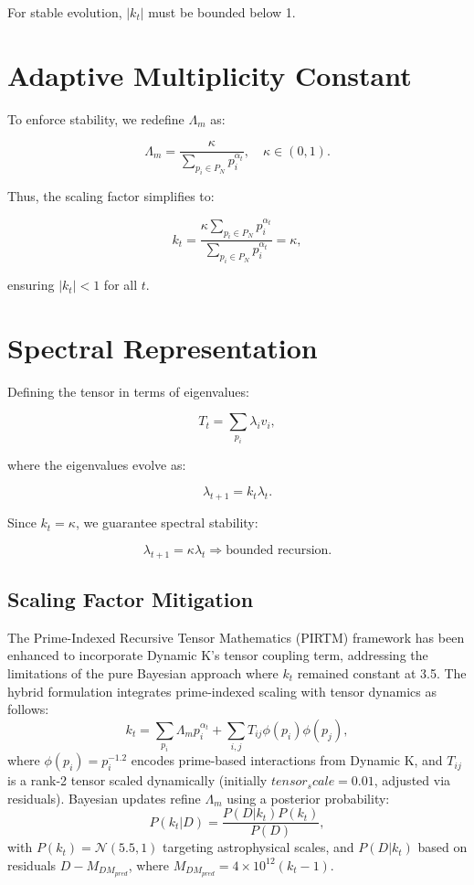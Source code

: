 \documentclass{article}
\theoremstyle{plain}
\begin{document}
For stable evolution, $|k_t|$ must be bounded below 1.

\section{Adaptive Multiplicity Constant}
To enforce stability, we redefine $\Lambda_m$ as:

\begin{equation}
    \Lambda_m = \frac{\kappa}{\sum_{p_i \in P_N} p_i^{\alpha_t}}, \quad \kappa \in (0,1).
\end{equation}

Thus, the scaling factor simplifies to:

\begin{equation}
    k_t = \frac{\kappa \sum_{p_i \in P_N} p_i^{\alpha_t}}{\sum_{p_i \in P_N} p_i^{\alpha_t}} = \kappa,
\end{equation}

ensuring $|k_t| < 1$ for all $t$.

\section{Spectral Representation}
Defining the tensor in terms of eigenvalues:

\begin{equation}
    T_t = \sum_{p_i} \lambda_i v_i,
\end{equation}

where the eigenvalues evolve as:

\begin{equation}
    \lambda_{t+1} = k_t \lambda_t.
\end{equation}

Since $k_t = \kappa$, we guarantee spectral stability:

\begin{equation}
    \lambda_{t+1} = \kappa \lambda_t \Rightarrow \text{bounded recursion}.
\end{equation}

\subsection{Scaling Factor Mitigation}
The Prime-Indexed Recursive Tensor Mathematics (PIRTM) framework has been enhanced to incorporate Dynamic K’s tensor coupling term, addressing the limitations of the pure Bayesian approach where \( k_t \) remained constant at 3.5. The hybrid formulation integrates prime-indexed scaling with tensor dynamics as follows:
\[
k_t = \sum_{p_i} \Lambda_m p_i^{\alpha_t} + \sum_{i,j} T_{ij} \phi(p_i) \phi(p_j),
\]
where \( \phi(p_i) = p_i^{-1.2} \) encodes prime-based interactions from Dynamic K, and \( T_{ij} \) is a rank-2 tensor scaled dynamically (initially \( tensor_scale = 0.01 \), adjusted via residuals). Bayesian updates refine \( \Lambda_m \) using a posterior probability:
\[
P(k_t | D) = \frac{P(D | k_t) P(k_t)}{P(D)},
\]
with \( P(k_t) = \mathcal{N}(5.5, 1) \) targeting astrophysical scales, and \( P(D | k_t) \) based on residuals \( D - M_{DM_{pred}} \), where \( M_{DM_{pred}} = 4 \times 10^{12} (k_t - 1) \).
\end{document}
